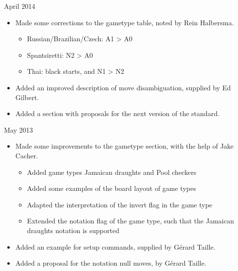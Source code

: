\documentclass[letterpaper,10pt,english]{sphinxmanual}
\begin{document}
 April 2014
\begin{itemize}
\item {} 
\sphinxAtStartPar
Made some corrections to the gametype table, noted by Rein Halbersma.
\begin{itemize}
\item {} 
\sphinxAtStartPar
Russian/Brazilian/Czech: A1 \sphinxhyphen{}\textgreater{} A0

\item {} 
\sphinxAtStartPar
Spantsiretti: N2 \sphinxhyphen{}\textgreater{} A0

\item {} 
\sphinxAtStartPar
Thai: black starts, and N1 \sphinxhyphen{}\textgreater{} N2

\end{itemize}

\item {} 
\sphinxAtStartPar
Added an improved description of move disambiguation, supplied by Ed Gilbert.

\item {} 
\sphinxAtStartPar
Added a section with proposals for the next version of the standard.

\end{itemize}

 May 2013
\begin{itemize}
\item {} 
\sphinxAtStartPar
Made some improvements to the gametype section, with the help of Jake Cacher.
\begin{itemize}
\item {} 
\sphinxAtStartPar
Added game types Jamaican draughts and Pool checkers

\item {} 
\sphinxAtStartPar
Added some examples of the board layout of game types

\item {} 
\sphinxAtStartPar
Adapted the interpretation of the invert flag in the game type

\item {} 
\sphinxAtStartPar
Extended the notation flag of the game type, such that the Jamaican draughts notation is supported

\end{itemize}

\item {} 
\sphinxAtStartPar
Added an example for setup commands, supplied by Gérard Taille.

\item {} 
\sphinxAtStartPar
Added a proposal for the notation null moves, by Gérard Taille.

\end{itemize}
\end{document}
